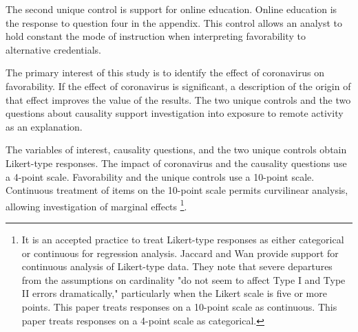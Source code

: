 \documentclass[review]{elsarticle}
\begin{document}
The second unique control is support for online education.
Online education is the response to question four in the appendix.
This control allows an analyst to hold constant the mode of instruction when interpreting favorability to alternative credentials.

The primary interest of this study is to identify the effect of coronavirus on favorability.
If the effect of coronavirus is significant, a description of the origin of that effect improves the value of the results.
The two unique controls and the two questions about causality support investigation into exposure to remote activity as an explanation.

The variables of interest,
causality questions,
and the two unique controls obtain Likert-type responses.
The impact of coronavirus and the causality questions use a 4-point scale.
Favorability and the unique controls use a 10-point scale.
Continuous treatment of items on the 10-point scale permits curvilinear analysis,
allowing investigation of marginal effects
\footnote{
    It is an accepted practice to treat Likert-type responses as either categorical or continuous for regression analysis.
    Jaccard and Wan provide support for continuous analysis of Likert-type data.
    They note that severe departures from the assumptions on cardinality "do not seem to affect Type I and Type II errors dramatically,"
    particularly when the Likert scale is five or more points\cite{jaccard1996lisrel}.
    This paper treats responses on a 10-point scale as continuous.
    This paper treats responses on a 4-point scale as categorical.
}.
\end{document}
